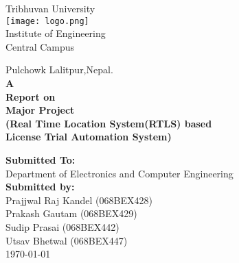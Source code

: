 \begin{titlepage}
	\begin{center}
		\begin{Huge}
			Tribhuvan University\\
			\texttt{[image: logo.png]}\\
			Institute of Engineering\\
			 Central Campus\\
		\end{Huge}
			Pulchowk Lalitpur,Nepal.\\
			\vfill
		\textbf{
					A\\
					Report on\\
					Major Project\\
					(Real Time Location System(RTLS) based\\
					License Trial Automation System)\\
				}
		\vfill

		\textbf{Submitted To:\\}
			Department of Electronics and Computer Engineering\\[2cm]
		\textbf{Submitted by:\\}
			Prajjwal Raj Kandel (068BEX428)\\
			Prakash Gautam (068BEX429)\\
			Sudip Prasai (068BEX442)\\
			Utsav Bhetwal (068BEX447)\\
			\vfill
			\today
	\end{center}
\end{titlepage}
